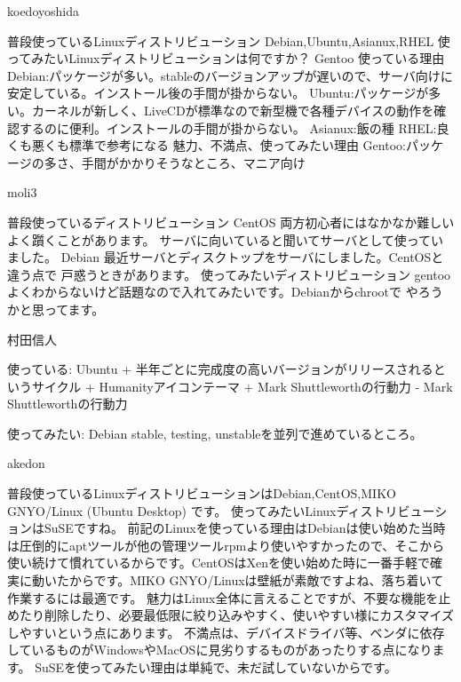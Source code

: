 \begin{prework}{ koedoyoshida }

普段使っているLinuxディストリビューション
Debian,Ubuntu,Asianux,RHEL
使ってみたいLinuxディストリビューションは何ですか？
Gentoo
使っている理由
Debian:パッケージが多い。stableのバージョンアップが遅いので、サーバ向けに安定している。インストール後の手間が掛からない。
Ubuntu:パッケージが多い。カーネルが新しく、LiveCDが標準なので新型機で各種デバイスの動作を確認するのに便利。インストールの手間が掛からない。
Asianux:飯の種
RHEL:良くも悪くも標準で参考になる
魅力、不満点、使ってみたい理由
Gentoo:パッケージの多さ、手間がかかりそうなところ、マニア向け


\end{prework}



\begin{prework}{ moli3 }

普段使っているディストリビューション
CentOS
両方初心者にはなかなか難しいよく躓くことがあります。
サーバに向いていると聞いてサーバとして使っていました。
Debian
最近サーバとディスクトップをサーバにしました。CentOSと違う点で
戸惑うときがあります。
使ってみたいディストリビューション
gentoo
よくわからないけど話題なので入れてみたいです。Debianからchrootで
やろうかと思ってます。

\end{prework}



\begin{prework}{ 村田信人 }

使っている: Ubuntu
+ 半年ごとに完成度の高いバージョンがリリースされるというサイクル
+ Humanityアイコンテーマ
+ Mark Shuttleworthの行動力
- Mark Shuttleworthの行動力

使ってみたい: Debian
stable, testing, unstableを並列で進めているところ。

\end{prework}



\begin{prework}{ akedon }

普段使っているLinuxディストリビューションはDebian,CentOS,MIKO GNYO/Linux (Ubuntu Desktop) です。
使ってみたいLinuxディストリビューションはSuSEですね。
前記のLinuxを使っている理由はDebianは使い始めた当時は圧倒的にaptツールが他の管理ツールrpmより使いやすかったので、そこから使い続けて慣れているからです。CentOSはXenを使い始めた時に一番手軽で確実に動いたからです。MIKO GNYO/Linuxは壁紙が素敵ですよね、落ち着いて作業するには最適です。 
魅力はLinux全体に言えることですが、不要な機能を止めたり削除したり、必要最低限に絞り込みやすく、使いやすい様にカスタマイズしやすいという点にあります。
不満点は、デバイスドライバ等、ベンダに依存しているものがWindowsやMacOSに見劣りするものがあったりする点になります。
SuSEを使ってみたい理由は単純で、未だ試していないからです。

\end{prework}



